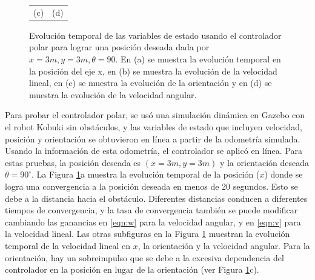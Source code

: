 \begin{figure}[ht!]
\begin{tabular}{cc}
    (c)&(d)
  \end{tabular}
  \caption{Evolución temporal de las variables de estado usando el controlador polar para 
  lograr una posición deseada dada por $x = 3 m, y = 3 m, \theta = 90$. En (a) se muestra la 
  evolución temporal en la posición del eje x, en (b) se muestra la evolución de la 
  velocidad lineal, en (c) se muestra la evolución de la orientación y en (d) se muestra 
  la evolución de la velocidad angular.}
  \label{f:PolarControl}
\end{figure}


Para probar el controlador polar, se usó una simulación dinámica en Gazebo con el robot 
Kobuki sin obstáculos, y las variables de estado que incluyen velocidad, posición y 
orientación se obtuvieron en línea a partir de la odometría simulada. Usando la información 
de esta odometría, el controlador se aplicó en línea. Para estas pruebas, la posición deseada
es $(x = 3 m, y = 3 m)$ y la orientación deseada $\theta = 90^{\circ}$. La Figura 
\ref{f:PolarControl}a muestra la evolución temporal de la posición ($x$) donde 
se logra una convergencia a la posición deseada en menos de 20 segundos. Esto se debe a 
la distancia hacia el obstáculo. Diferentes distancias conducen a diferentes tiempos de 
convergencia, y la tasa de convergencia también se puede modificar cambiando las 
ganancias en \ref{eqn:w} para la velocidad angular, y en \ref{eqn:v} para la velocidad 
lineal. Las otras subfiguras en la Figura \ref{f:PolarControl} muestran la evolución 
temporal de la velocidad lineal en $x$, la orientación y la velocidad angular. Para la 
orientación, hay un sobreimpulso que se debe a la excesiva dependencia del controlador 
en la posición en lugar de la orientación (ver Figura \ref{f:PolarControl}c).

